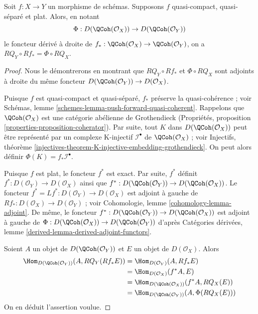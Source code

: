 \begin{lemma}
\label{lemma-flat-pushforward-coherator}
Soit $f : X \to Y$ un morphisme de schémas. Supposons $f$
quasi-compact, quasi-séparé et plat. Alors, en notant
$$
\Phi : D(\QCoh(\mathcal{O}_X)) \to D(\QCoh(\mathcal{O}_Y))
$$
le foncteur dérivé à droite de
$f_* : \QCoh(\mathcal{O}_X) \to \QCoh(\mathcal{O}_Y)$,
on a $RQ_Y \circ Rf_* = \Phi \circ RQ_X$.
\end{lemma}

\begin{proof}
Nous le démontrerons en montrant que $RQ_Y \circ Rf_*$ et $\Phi \circ RQ_X$
sont adjoints à droite du même foncteur
$D(\QCoh(\mathcal{O}_Y)) \to D(\mathcal{O}_X)$.

\medskip\noindent
Puisque $f$ est quasi-compact et quasi-séparé,
$f_*$ préserve la quasi-cohérence ; voir
Schémas, lemme \ref{schemes-lemma-push-forward-quasi-coherent}.
Rappelons que $\QCoh(\mathcal{O}_X)$ est une catégorie abélienne de Grothendieck
(Propriétés, proposition \ref{properties-proposition-coherator}).
Par suite, tout $K$ dans $D(\QCoh(\mathcal{O}_X))$
peut être représenté par un complexe K-injectif $\mathcal{I}^\bullet$
de $\QCoh(\mathcal{O}_X)$ ; voir
Injectifs, théorème
\ref{injectives-theorem-K-injective-embedding-grothendieck}.
On peut alors définir $\Phi(K) = f_*\mathcal{I}^\bullet$.

\medskip\noindent
Puisque $f$ est plat, le foncteur $f^*$ est exact. Par suite, $f^*$ définit
$f^* : D(\mathcal{O}_Y) \to D(\mathcal{O}_X)$ ainsi que
$f^* : D(\QCoh(\mathcal{O}_Y)) \to D(\QCoh(\mathcal{O}_X))$.
Le foncteur $f^* = Lf^* : D(\mathcal{O}_Y) \to D(\mathcal{O}_X)$
est adjoint à gauche de
$Rf_* : D(\mathcal{O}_X) \to D(\mathcal{O}_Y)$ ;
voir Cohomologie, lemme \ref{cohomology-lemma-adjoint}.
De même, le foncteur
$f^* : D(\QCoh(\mathcal{O}_Y)) \to D(\QCoh(\mathcal{O}_X))$
est adjoint à gauche de
$\Phi : D(\QCoh(\mathcal{O}_X)) \to D(\QCoh(\mathcal{O}_Y))$
d'après Catégories dérivées, lemme \ref{derived-lemma-derived-adjoint-functors}.

\medskip\noindent
Soient $A$ un objet de $D(\QCoh(\mathcal{O}_Y))$ et
$E$ un objet de $D(\mathcal{O}_X)$. Alors
\begin{align*}
\Hom_{D(\QCoh(\mathcal{O}_Y))}(A, RQ_Y(Rf_*E))
& =
\Hom_{D(\mathcal{O}_Y)}(A, Rf_*E) \\
& =
\Hom_{D(\mathcal{O}_X)}(f^*A, E) \\
& =
\Hom_{D(\QCoh(\mathcal{O}_X))}(f^*A, RQ_X(E)) \\
& =
\Hom_{D(\QCoh(\mathcal{O}_Y))}(A, \Phi(RQ_X(E)))
\end{align*}
On en déduit l'assertion voulue.
\end{proof}

